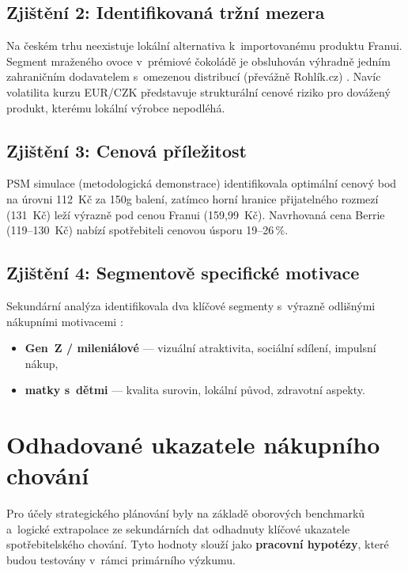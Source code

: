 \subsection{Zjištění 2: Identifikovaná tržní mezera}

Na českém trhu neexistuje lokální alternativa k~importovanému produktu Franui. Segment mraženého ovoce v~prémiové čokoládě je obsluhován výhradně jedním zahraničním dodavatelem s~omezenou distribucí (převážně Rohlík.cz) \parencite{rohlik_franui_2026}. Navíc volatilita kurzu EUR/CZK \parencite{cnb_kurzy_2026} představuje strukturální cenové riziko pro dovážený produkt, kterému lokální výrobce nepodléhá.

\subsection{Zjištění 3: Cenová příležitost}

PSM simulace (metodologická demonstrace) identifikovala optimální cenový bod na úrovni 112~Kč za 150g balení, zatímco horní hranice přijatelného rozmezí (131~Kč) leží výrazně pod cenou Franui (159,99~Kč). Navrhovaná cena Berrie (119--130~Kč) nabízí spotřebiteli cenovou úsporu 19--26\,\%.

\subsection{Zjištění 4: Segmentově specifické motivace}

Sekundární analýza identifikovala dva klíčové segmenty s~výrazně odlišnými nákupními motivacemi \parencite{solomon_2020, vysekalova_2011}:
\begin{itemize}
  \item \textbf{Gen~Z / mileniálové} — vizuální atraktivita, sociální sdílení, impulsní nákup,
  \item \textbf{matky s~dětmi} — kvalita surovin, lokální původ, zdravotní aspekty.
\end{itemize}

\section{Odhadované ukazatele nákupního chování}
\label{sec:res_estimated_indicators}

Pro účely strategického plánování byly na základě oborových benchmarků a~logické extrapolace ze sekundárních dat odhadnuty klíčové ukazatele spotřebitelského chování. Tyto hodnoty slouží jako \textbf{pracovní hypotézy}, které budou testovány v~rámci primárního výzkumu.

